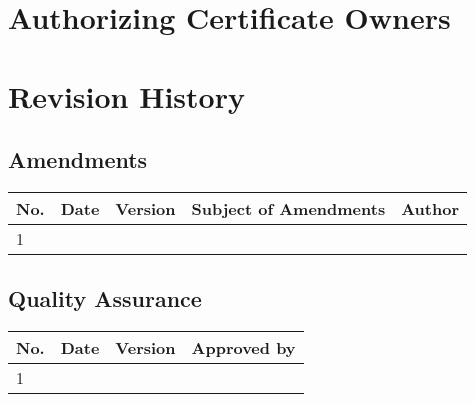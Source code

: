 \documentclass[a4paper]{arrowhead}
\begin{document}
\section{Authorizing Certificate Owners}
\label{sec:authorization}


\renewcommand{\bibsection}{\section{References}\label{sec:references}}



\newpage

\section{Revision History}
\label{sec:revision}

\subsection{Amendments}

\noindent\begin{tabularx}{\textwidth}{| p{1cm} | p{2cm} | p{1.25cm} | X | p{4cm} |} \hline
\rowcolor{gray!33} No. & Date & Version & Subject of Amendments & Author \\ \hline

1 & & & & \\ \hline

\end{tabularx}

\subsection{Quality Assurance}

\noindent\begin{tabularx}{\textwidth}{| p{1cm} | p{2cm} | p{1.25cm} | X |} \hline
\rowcolor{gray!33} No. & Date & Version & Approved by \\ \hline

1 & & & \\ \hline

\end{tabularx}
\end{document}
